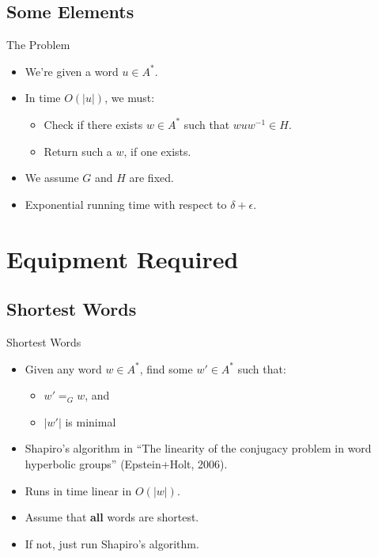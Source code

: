 \documentclass{beamer}
\begin{document}
\subsection{Some Elements}

\begin{frame}{The Problem}
  \begin{itemize}
    \item We're given a word $u \in A^*$.
	\item In time $O(|u|)$, we must:
	\pause
	\begin{itemize}
	  \item Check if there exists $w \in A^*$ such that $wuw^{-1} \in H$.
	  \pause
	  \item Return such a $w$, if one exists.
	\end{itemize}
	\pause
	\item We assume $G$ and $H$ are fixed.
	\item Exponential running time with respect to $\delta + \epsilon$.
  \end{itemize}
\end{frame}

\section{Equipment Required}

\subsection{Shortest Words}

\begin{frame}{Shortest Words}
  \begin{itemize}
    \item Given any word $w \in A^*$, find some $w' \in A^*$ such that:
	\begin{itemize}
	  \item $w' =_G w$, and
	  \item $|w'|$ is minimal
	\end{itemize}
	\pause
	\item Shapiro's algorithm in ``The linearity of the conjugacy problem in word hyperbolic groups'' (Epstein+Holt, 2006).
	\item Runs in time linear in $O(|w|)$.
	\pause
	\item Assume that \textbf{all} words are shortest.
	\item If not, just run Shapiro's algorithm.
  \end{itemize}
\end{frame}
\end{document}
